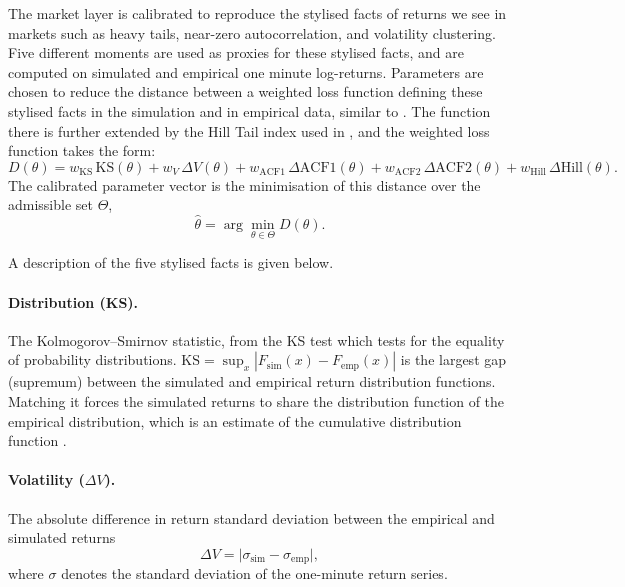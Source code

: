 The market layer is calibrated to reproduce the stylised facts of returns we see in markets \citep{cont_2001} such as heavy tails, near-zero autocorrelation, and volatility clustering. Five different moments are used as proxies for these stylised facts, and are computed on simulated and empirical one minute log-returns. Parameters are chosen to reduce the distance between a weighted loss function defining these stylised facts in the simulation and in empirical data, similar to \cite{gao_2022_xgb}. The function there is further extended by the Hill Tail index used in \cite{gao_2022_hfabm}, and the weighted loss function takes the form:
\begin{equation}
\label{eq:cal-D}
D(\theta) = w_{\mathrm{KS}}\,\mathrm{KS}(\theta) + w_{V}\,\Delta V(\theta)
          + w_{\mathrm{ACF1}}\,\Delta\mathrm{ACF1}(\theta)
          + w_{\mathrm{ACF2}}\,\Delta\mathrm{ACF2}(\theta)
          + w_{\mathrm{Hill}}\,\Delta\mathrm{Hill}(\theta).
\end{equation}
The calibrated parameter vector is the minimisation of this distance over the admissible set $\Theta$,
\begin{equation}
\label{eq:cal-argmin}
\hat\theta = \arg\min_{\theta\in
\Theta} D(\theta).
\end{equation} 

\noindent A description of the five stylised facts is given below.

\paragraph{Distribution (KS).} The Kolmogorov--Smirnov statistic, from the KS test which tests for the equality of probability distributions.
$\mathrm{KS}=\sup_x|F_{\mathrm{sim}}(x)-F_{\mathrm{emp}}(x)|$ is the largest gap (supremum) between the simulated
and empirical return distribution functions. Matching it forces the simulated returns to share the
distribution function of the empirical distribution, which is an estimate of the cumulative distribution function \citep{gao_2022_xgb}.

\paragraph{Volatility ($\Delta V$).} The absolute difference in return standard deviation between the empirical and simulated returns
\begin{equation}
\Delta V = \big| \sigma_{\mathrm{sim}} - \sigma_{\mathrm{emp}} \big|,
\end{equation}
where $\sigma$ denotes the standard deviation of the one-minute return series.

